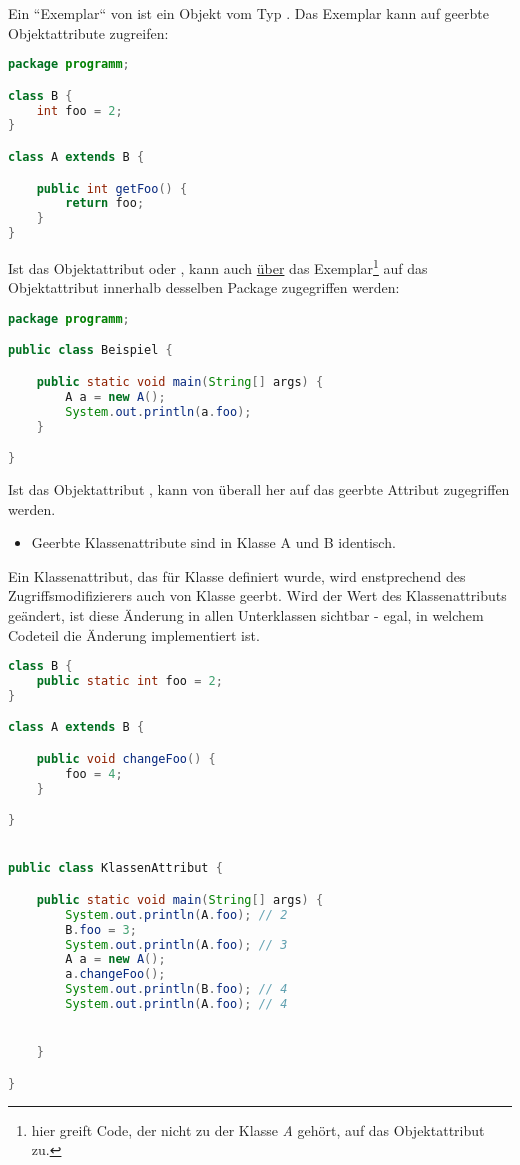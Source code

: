 Ein ``Exemplar`` von  ist ein Objekt vom Typ .
Das Exemplar kann auf geerbte Objektattribute zugreifen:

\begin{lstlisting}[language=java]
package programm;

class B {
    int foo = 2;
}

class A extends B {

    public int getFoo() {
        return foo;
    }
}
\end{lstlisting}


Ist das Objektattribut  oder , kann auch \underline{über} das Exemplar\footnote{
hier greift Code, der nicht zu der Klasse \textit{A} gehört, auf das Objektattribut zu.
} auf das Objektattribut
innerhalb desselben Package zugegriffen werden:

\begin{lstlisting}[language=java]
package programm;

public class Beispiel {

    public static void main(String[] args) {
        A a = new A();
        System.out.println(a.foo);
    }

}
\end{lstlisting}

Ist das Objektattribut , kann von überall her auf das geerbte Attribut zugegriffen werden.


\begin{itemize}
    \item Geerbte Klassenattribute sind in Klasse A und B identisch.
\end{itemize}

Ein Klassenattribut, das für Klasse  definiert wurde, wird enstprechend des Zugriffsmodifizierers auch von Klasse  geerbt.
Wird der Wert des Klassenattributs geändert, ist diese Änderung in allen Unterklassen sichtbar - egal, in welchem Codeteil die Änderung
implementiert ist.


\begin{lstlisting}[language=java]
class B {
    public static int foo = 2;
}

class A extends B {

    public void changeFoo() {
        foo = 4;
    }

}


public class KlassenAttribut {

    public static void main(String[] args) {
        System.out.println(A.foo); // 2
        B.foo = 3;
        System.out.println(A.foo); // 3
        A a = new A();
        a.changeFoo();
        System.out.println(B.foo); // 4
        System.out.println(A.foo); // 4


    }

}
\end{lstlisting}

